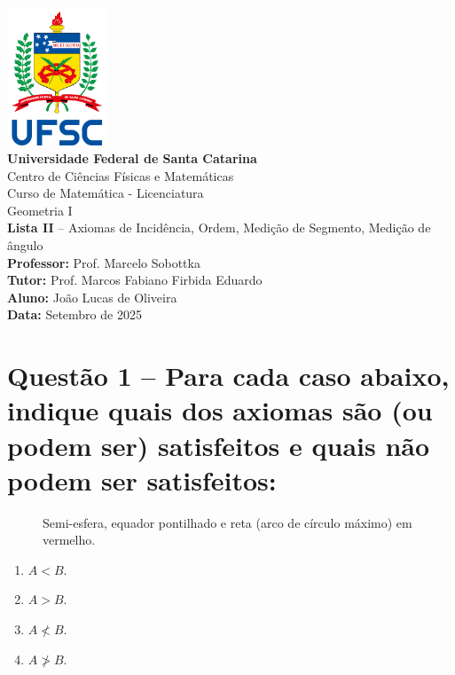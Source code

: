 \documentclass[12pt,a4paper]{article}
\newcommand{\universidade}{Universidade Federal de Santa Catarina}
\newcommand{\centro}{Centro de Ciências Físicas e Matemáticas}
\newcommand{\curso}{Curso de Matemática - Licenciatura}
\newcommand{\disciplina}{Geometria I}
\newcommand{\professor}{Prof. Marcelo Sobottka}
\newcommand{\tutor}{Prof. Marcos Fabiano Firbida Eduardo}
\newcommand{\autor}{João Lucas de Oliveira}
\newcommand{\dataentrega}{Setembro de 2025}
\begin{document}
\begin{center}
    \includegraphics[width=3cm]{ufsc_logo}\\[0.3cm]
    \textbf{\universidade}\\
    \centro\\
    \curso\\[1cm]
    \disciplina{}\\
    \textbf{Lista II} -- Axiomas de Incid\^encia, Ordem, Medi\c{c}\~ao de Segmento, Medi\c{c}\~ao de \^angulo\\[0.5cm]
    \textbf{Professor:} \professor{}\\
    \textbf{Tutor:} \tutor{}\\
    \textbf{Aluno:} \autor{}\\
    \textbf{Data:} \dataentrega{}
\end{center}

\vspace{1cm}

\section*{Questão 1 -- Para cada caso abaixo, indique quais dos axiomas são (ou podem ser) satisfeitos e quais não podem ser satisfeitos:}
    \begin{figure}[h]
        \centering
        \caption{Semi-esfera, equador pontilhado e reta (arco de círculo máximo) em vermelho.}
    \end{figure}
  
    \begin{enumerate}[label= (\roman*)]
        \item  $A < B$.

        \item  $A > B$.

        \item  $A \not< B$.

        \item  $A \not> B$.

    \end{enumerate}
\end{document}

